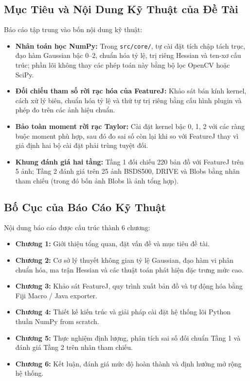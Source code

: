 \documentclass[conference]{IEEEtran}
\begin{document}
\subsection{Mục Tiêu và Nội Dung Kỹ Thuật của Đề Tài}
Báo cáo tập trung vào bốn nội dung kỹ thuật:
\begin{itemize}
    \item \textbf{Nhân toán học NumPy:} Trong \texttt{src/core/}, tự cài đặt tích chập tách trục, đạo hàm Gaussian bậc 0--2, chuẩn hóa tỷ lệ, trị riêng Hessian và ten-xơ cấu trúc; phần lõi không thay các phép toán này bằng bộ lọc OpenCV hoặc SciPy.
    \item \textbf{Đối chiếu tham số rời rạc hóa của FeatureJ:} Khảo sát bán kính kernel, cách xử lý biên, chuẩn hóa tỷ lệ và thứ tự trị riêng bằng cấu hình plugin và phép đo trên các ảnh hiệu chuẩn.
    \item \textbf{Bảo toàn moment rời rạc Taylor:} Cài đặt kernel bậc 0, 1, 2 với các ràng buộc moment phù hợp, sau đó đo sai số còn lại khi so với FeatureJ thay vì giả định hai bộ cài đặt phải trùng tuyệt đối.
    \item \textbf{Khung đánh giá hai tầng:} Tầng 1 đối chiếu 220 bản đồ với FeatureJ trên 5 ảnh; Tầng 2 đánh giá trên 25 ảnh BSDS500, DRIVE và Blobs bằng nhãn tham chiếu (trong đó bốn ảnh Blobs là ảnh tổng hợp).
\end{itemize}

\subsection{Bố Cục của Báo Cáo Kỹ Thuật}
Nội dung báo cáo được cấu trúc thành 6 chương:
\begin{itemize}
    \item \textbf{Chương 1:} Giới thiệu tổng quan, đặt vấn đề và mục tiêu đề tài.
    \item \textbf{Chương 2:} Cơ sở lý thuyết không gian tỷ lệ Gaussian, đạo hàm vi phân chuẩn hóa, ma trận Hessian và các thuật toán phát hiện đặc trưng mức cao.
    \item \textbf{Chương 3:} Khảo sát FeatureJ, quy trình xuất bản đồ và tự động hóa bằng Fiji Macro / Java exporter.
    \item \textbf{Chương 4:} Thiết kế kiến trúc và giải pháp cài đặt hệ thống lõi Python thuần NumPy from scratch.
    \item \textbf{Chương 5:} Thực nghiệm định lượng, phân tích sai số đối chuẩn Tầng 1 và đánh giá Tầng 2 trên nhãn tham chiếu.
    \item \textbf{Chương 6:} Kết luận, đánh giá mức độ hoàn thành và định hướng mở rộng hệ thống.
\end{itemize}
\end{document}

